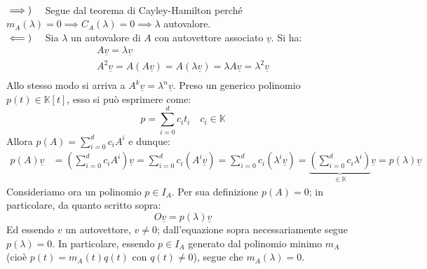 \begin{demonstration}~{}\\
	$\implies)\quad$ Segue dal teorema di Cayley-Hamilton perché $m_A\left(\lambda\right)=0\implies C_A\left(\lambda\right)=0\implies \lambda$ autovalore.\\
	$\impliedby)\quad$ Sia $\lambda$ un autovalore di $A$ con autovettore associato $\underline{v}$. Si ha:
	\begin{gather*}
		A\underline{v}=\lambda \underline{v}\\
		A^2\underline{v}=A\left(A\underline{v}\right)=A\left(\lambda \underline{v}\right)=\lambda A\underline{v}=\lambda^2 \underline{v}\\
	\end{gather*}
Allo stesso modo si arriva a $A^k\underline{v}=\lambda^n\underline{v}$. Preso un generico polinomio $p\left(t\right)\in\mathbb{K}\left[t\right]$, esso si può esprimere come:
\begin{equation*}
	p=\sum_{i=0}^{d}c_i t_i\quad c_i\in\mathbb{K}
\end{equation*}
Allora $\displaystyle p\left(A\right)=\sum_{i=0}^{d}c_i A^i$ e dunque:
\begin{align*}
	p\left(A\right)\underline{v}&=\left(\sum_{i=0}^{d}c_i A^i\right)\underline{v}=\sum_{i=0}^{d}c_i\left( A^i\underline{v}\right)=\sum_{i=0}^{d}c_i\left( \lambda^i\underline{v}\right)=\underbrace{\left(\sum_{i=0}^{d}c_i \lambda^i\right)}_{\in\mathbb{K}}\underline{v}=p\left(\lambda\right)\underline{v}
\end{align*}
Consideriamo ora un polinomio $p\in I_A$. Per sua definizione $p\left(A\right)=0$; in particolare, da quanto scritto sopra:
\begin{equation*}
	O\underline{v}=p\left(\lambda\right)\underline{v}
\end{equation*}
Ed essendo $v$ un autovettore, $v\neq 0$; dall'equazione sopra necessariamente segue $p\left(\lambda\right)=0$. In particolare, essendo $p\in I_A$ generato dal polinomio minimo $m_A$ (cioè $p\left(t\right)=m_A\left(t\right)q\left(t\right)$ con $q\left(t\right)\neq 0$), segue che $m_A\left(\lambda\right)=0$.
\end{demonstration}
